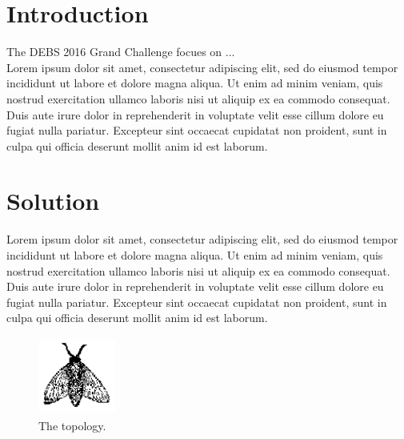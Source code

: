 \documentclass{sig-alternate-05-2015}
\begin{document}


\printccsdesc


\section{Introduction}
The DEBS 2016 Grand Challenge \cite{JerzakZiekow2014} focues on ...
\\
Lorem ipsum dolor sit amet, consectetur adipiscing elit, sed do eiusmod tempor incididunt ut labore et dolore magna aliqua.
Ut enim ad minim veniam, quis nostrud exercitation ullamco laboris nisi ut aliquip ex ea commodo consequat.
Duis aute irure dolor in reprehenderit in voluptate velit esse cillum dolore eu fugiat nulla pariatur.
Excepteur sint occaecat cupidatat non proident, sunt in culpa qui officia deserunt mollit anim id est laborum.

\section{Solution}
Lorem ipsum dolor sit amet, consectetur adipiscing elit, sed do eiusmod tempor incididunt ut labore et dolore magna aliqua.
Ut enim ad minim veniam, quis nostrud exercitation ullamco laboris nisi ut aliquip ex ea commodo consequat.
Duis aute irure dolor in reprehenderit in voluptate velit esse cillum dolore eu fugiat nulla pariatur.
Excepteur sint occaecat cupidatat non proident, sunt in culpa qui officia deserunt mollit anim id est laborum.

\begin{figure}
	\centering
	\includegraphics[height=1in, width=1in]{img/fly}
	\caption{The topology.}
\end{figure}
\end{document}
